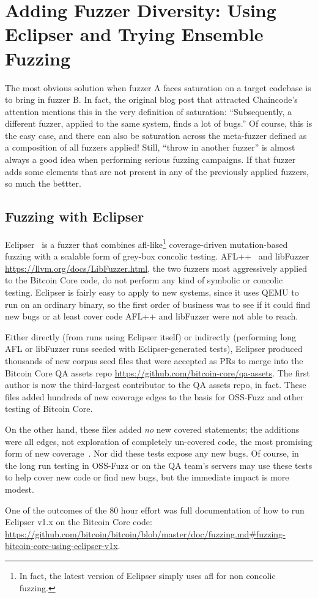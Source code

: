 \section{Adding Fuzzer Diversity: Using Eclipser and Trying Ensemble Fuzzing}

The most obvious solution when fuzzer A faces saturation on a target codebase is to bring in fuzzer B.  In fact, the original blog post that attracted Chaincode's attention mentions this in the very definition of saturation:  ``Subsequently, a different fuzzer, applied to the same system, finds a lot of bugs.''  Of course, this is the easy case, and there can also be saturation across the meta-fuzzer defined as a composition of all fuzzers applied!  Still, ``throw in another fuzzer'' is almost always a good idea when performing serious fuzzing campaigns.  If that fuzzer adds some elements that are not present in any of the previously applied fuzzers, so much the bettter.

\subsection{Fuzzing with Eclipser}

\begin{sloppypar}
Eclipser~\cite{eclipser} is a fuzzer that combines afl-like\footnote{In fact, the latest version of Eclipser simply uses afl for non concolic fuzzing.} coverage-driven mutation-based fuzzing with a scalable form of grey-box concolic testing.  AFL++~\cite{AFLplusplus-Woot20} and libFuzzer \url{https://llvm.org/docs/LibFuzzer.html}, the two fuzzers most aggressively applied to the Bitcoin Core code, do not perform any kind of symbolic or concolic testing.  Eclipser is fairly easy to apply to new systems, since it uses QEMU to run on an ordinary binary, so the first order of business was to see if it could find new bugs or at least cover code AFL++ and libFuzzer were not able to reach.

Either directly (from runs using Eclipser itself) or indirectly (performing long AFL or libFuzzer runs seeded with Eclipser-generated tests), Eclipser produced thousands of new corpus seed files that were accepted as PRs to merge into the Bitcoin Core QA assets repo \url{https://github.com/bitcoin-core/qa-assets}.  The first author is now the third-largest contributor to the QA assets repo, in fact.  These files added hundreds of new coverage edges to the basis for OSS-Fuzz and other testing of Bitcoin Core.

On the other hand, these files added \emph{no} new covered statements; the additions were all edges, not exploration of completely un-covered code, the most promising form of new coverage~\cite{covdev,testedness}.  Nor did these tests expose any new bugs.  Of course, in the long run testing in OSS-Fuzz or on the QA team's servers may use these tests to help cover new code or find new bugs, but the immediate impact is more modest.

  One of the outcomes of the 80 hour effort was full documentation of how to run Eclipser v1.x on the Bitcoin Core code:  \url{https://github.com/bitcoin/bitcoin/blob/master/doc/fuzzing.md#fuzzing-bitcoin-core-using-eclipser-v1x}.
  \end{sloppypar}